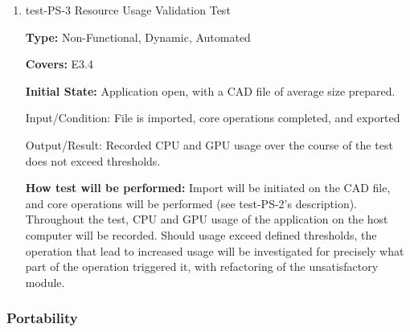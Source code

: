 \documentclass[12pt, titlepage]{article}
\begin{document}
\begin{enumerate}
\textbf{How test will be performed:} Import will be initiated on each CAD file (three files will be prepared, ranging from small (estimated 100 voxels)
to semi-large (100,000 voxels)). Timing and latency will be recorded for importing the CAD file, changing the orientation of the 
project file, opening layer focus, editing properties of voxel selections of varying sizes (1 voxel, 100, and a full layer), and exporting
the completed project file. These times will then be compared against the defined minimum latencies and expected times given minimum processing
rates. Should performance fall short of these expectations, specific sections that fail will have their code reviewed to identify areas 
that can be optimized. %

\item{test-PS-3 Resource Usage Validation Test\\}
\label{sec:t-nf-9}

\textbf{Type:} Non-Functional, Dynamic, Automated

\textbf{Covers:} E3.4 %
					
\textbf{Initial State:} Application open, with a CAD file of average size prepared.
					
Input/Condition: File is imported, core operations completed, and exported
					
Output/Result: Recorded CPU and GPU usage over the course of the test does not exceed thresholds. %
					
\textbf{How test will be performed:} Import will be initiated on the CAD file, and core operations will be performed (see test-PS-2's description). 
Throughout the test, CPU and GPU usage of the application on the host computer will be recorded. Should usage exceed defined thresholds, the operation
that lead to increased usage will be investigated for precisely what part of the operation triggered it, with refactoring of the unsatisfactory module.

\end{enumerate}

\subsubsection{Portability}
\end{document}
